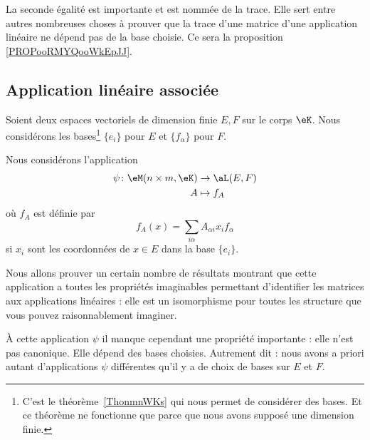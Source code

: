 \begin{normaltext}
    La seconde égalité est importante et est nommée  de la trace. Elle sert entre autres nombreuses choses à prouver que la trace d'une matrice d'une application linéaire ne dépend pas de la base choisie. Ce sera la proposition \ref{PROPooRMYQooWkEpJJ}.
\end{normaltext}

\subsection{Application linéaire associée}

Soient deux espaces vectoriels de dimension finie \( E,F\) sur le corps \( \eK\). Nous considérons les bases\footnote{C'est le théorème~\ref{ThonmnWKs} qui nous permet de considérer des bases. Et ce théorème ne fonctionne que parce que nous avons supposé une dimension finie.} \( \{ e_i \}\) pour \( E\) et \( \{ f_{\alpha} \}\) pour \( F\). 

\begin{definition}      \label{DEFooJVOAooUgGKme}
    Nous considérons l'application
    \begin{equation}        \label{EQooVZQWooMyFFeO}
        \begin{aligned}
            \psi\colon \eM(n\times m, \eK)&\to \aL(E,F) \\
            A&\mapsto f_A 
        \end{aligned}
    \end{equation}
    où \( f_A\) est définie par
    \begin{equation}
        f_A(x)=\sum_{i\alpha}A_{\alpha i}x_if_{\alpha}
    \end{equation}
    si \( x_i\) sont les coordonnées de \( x\in E\) dans la base \( \{ e_i \}\).
\end{definition}


Nous allons prouver un certain nombre de résultats montrant que cette application a toutes les propriétés imaginables permettant d'identifier les matrices aux applications linéaires : elle est un isomorphisme pour toutes les structure que vous pouvez raisonnablement imaginer.

À cette application \( \psi\) il manque cependant une propriété importante : elle n'est pas canonique. Elle dépend des bases choisies. Autrement dit : nous avons a priori autant d'applications \( \psi\) différentes qu'il y a de choix de bases sur \( E\) et \( F\). %

